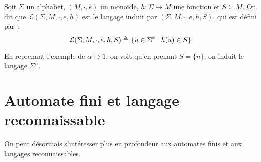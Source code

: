 \begin{definition}
  Soit $\Sigma$ un alphabet, $(M,\cdot,e)$ un monoïde, $h : \Sigma \to M$ une
  fonction et $S\subseteq M$. On dit que $\mathcal L(\Sigma,M,\cdot,e,h)$ est
  le langage induit par $(\Sigma,M,\cdot,e,h,S)$, qui est défini par~:
  \[\mathcal L(\Sigma,M,\cdot,e,h,S)\triangleq
  \{u\in\Sigma^*\mid \tilde h(u)\in S\}\]
\end{definition}

En reprenant l'exemple de $\alpha \mapsto 1$, on voit qu'en prenant $S = \{n\}$,
on induit le langage $\Sigma^n$.

\section{Automate fini et langage reconnaissable}

On peut désormais s'intéresser plus en profondeur aux automates finis et aux
langages reconnaissables.
